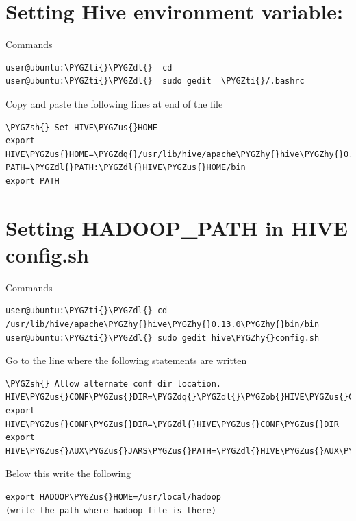 \documentclass[a4paper,12pt,oneside]{sphinxmanual}
\def\PYGZus{\char`\_}
\def\PYGZob{\char`\{}
\def\PYGZsh{\char`\#}
\def\PYGZdl{\char`\$}
\def\PYGZhy{\char`\-}
\def\PYGZdq{\char`\"}
\def\PYGZti{\char`\~}
\begin{document}
\section{Setting Hive environment variable:}
\label{document:setting-hive-environment-variable}
Commands

\begin{Verbatim}[commandchars=\\\{\}]
user@ubuntu:\PYGZti{}\PYGZdl{}  cd
user@ubuntu:\PYGZti{}\PYGZdl{}  sudo gedit  \PYGZti{}/.bashrc
\end{Verbatim}

Copy and paste the following lines at end of the file

\begin{Verbatim}[commandchars=\\\{\}]
\PYGZsh{} Set HIVE\PYGZus{}HOME
export HIVE\PYGZus{}HOME=\PYGZdq{}/usr/lib/hive/apache\PYGZhy{}hive\PYGZhy{}0.13.0\PYGZhy{}bin\PYGZdq{}
PATH=\PYGZdl{}PATH:\PYGZdl{}HIVE\PYGZus{}HOME/bin
export PATH
\end{Verbatim}


\section{Setting HADOOP\_PATH in HIVE config.sh}
\label{document:setting-hadoop-path-in-hive-config-sh}
Commands

\begin{Verbatim}[commandchars=\\\{\}]
user@ubuntu:\PYGZti{}\PYGZdl{} cd  /usr/lib/hive/apache\PYGZhy{}hive\PYGZhy{}0.13.0\PYGZhy{}bin/bin
user@ubuntu:\PYGZti{}\PYGZdl{} sudo gedit hive\PYGZhy{}config.sh
\end{Verbatim}

Go to the line where the following statements are written

\begin{Verbatim}[commandchars=\\\{\}]
\PYGZsh{} Allow alternate conf dir location.
HIVE\PYGZus{}CONF\PYGZus{}DIR=\PYGZdq{}\PYGZdl{}\PYGZob{}HIVE\PYGZus{}CONF\PYGZus{}DIR:\PYGZhy{}\PYGZdl{}HIVE\PYGZus{}HOME/conf\PYGZdq{}
export HIVE\PYGZus{}CONF\PYGZus{}DIR=\PYGZdl{}HIVE\PYGZus{}CONF\PYGZus{}DIR
export HIVE\PYGZus{}AUX\PYGZus{}JARS\PYGZus{}PATH=\PYGZdl{}HIVE\PYGZus{}AUX\PYGZus{}JARS\PYGZus{}PATH
\end{Verbatim}

Below this write the following

\begin{Verbatim}[commandchars=\\\{\}]
export HADOOP\PYGZus{}HOME=/usr/local/hadoop
(write the path where hadoop file is there)
\end{Verbatim}
\end{document}
